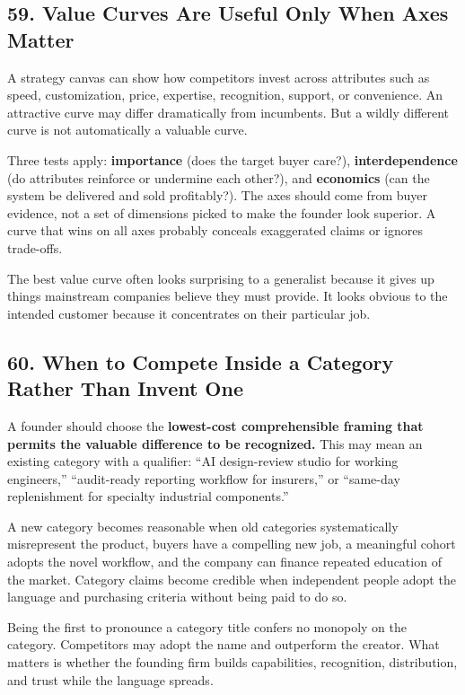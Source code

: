 \subsection*{59. Value Curves Are Useful Only When Axes Matter}

A strategy canvas can show how competitors invest across attributes such as speed, customization, price, expertise, recognition, support, or convenience. An attractive curve may differ dramatically from incumbents. But a wildly different curve is not automatically a valuable curve.

Three tests apply: \textbf{importance} (does the target buyer care?), \textbf{interdependence} (do attributes reinforce or undermine each other?), and \textbf{economics} (can the system be delivered and sold profitably?). The axes should come from buyer evidence, not a set of dimensions picked to make the founder look superior. A curve that wins on all axes probably conceals exaggerated claims or ignores trade-offs.

The best value curve often looks surprising to a generalist because it gives up things mainstream companies believe they must provide. It looks obvious to the intended customer because it concentrates on their particular job.

\subsection*{60. When to Compete Inside a Category Rather Than Invent One}

A founder should choose the \textbf{lowest-cost comprehensible framing that permits the valuable difference to be recognized.} This may mean an existing category with a qualifier: ``AI design-review studio for working engineers,'' ``audit-ready reporting workflow for insurers,'' or ``same-day replenishment for specialty industrial components.''

A new category becomes reasonable when old categories systematically misrepresent the product, buyers have a compelling new job, a meaningful cohort adopts the novel workflow, and the company can finance repeated education of the market. Category claims become credible when independent people adopt the language and purchasing criteria without being paid to do so.

Being the first to pronounce a category title confers no monopoly on the category. Competitors may adopt the name and outperform the creator. What matters is whether the founding firm builds capabilities, recognition, distribution, and trust while the language spreads.

